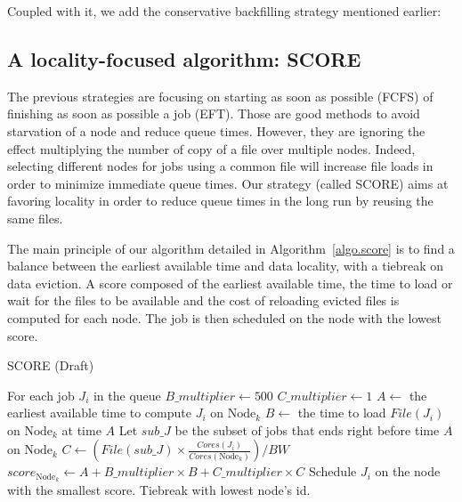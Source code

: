 \documentclass[conference,10pt]{IEEEtran}
\newcommand{\Node}[1]{\ensuremath{\mathrm{Node}_{#1}}\xspace}
\newcommand{\file}{\ensuremath{\mathit{File}}\xspace}
\newcommand{\memory}{\ensuremath{\mathit{Mem}}\xspace}
\newcommand{\bandwidth}{\mathit{BW}\xspace}
\newcommand{\core}{\mathit{Cores}\xspace}
\newcommand{\nodeset}{\ensuremath{\mathbb{N}}\xspace}
\begin{document}
Coupled with it, we add the conservative backfilling strategy mentioned earlier:

\subsection{A locality-focused algorithm: SCORE}

The previous strategies are focusing on starting as soon as possible (FCFS)
of finishing as soon as possible a job (EFT).
Those are good methods to avoid starvation of a node and reduce queue times.
However, they are ignoring the effect multiplying the number of copy of a file
over multiple nodes. Indeed, selecting different nodes for jobs using a common
file will increase file loads in order to minimize immediate queue times.
Our strategy (called SCORE) aims at favoring locality in order to reduce
queue times in the long run by reusing the same files. 

The main principle of our algorithm detailed in Algorithm~\ref{algo.score} 
is to find a balance between the earliest available time and data locality,
with a tiebreak on data eviction. A score composed of the earliest available 
time, the time to load or wait for the files to be available and the cost of 
reloading evicted files is computed for each node. The job is then scheduled
on the node with the lowest score.

\begin{algorithm}[htbp]\caption{SCORE (Draft)}\label{algo.score}\begin{algorithmic}[1]
	\Statex For each job $J_i$ in the queue
	\State $B\_multiplier \gets 500$
	\State $C\_multiplier \gets 1$
	\ForEach {$\Node{k} \in \nodeset$}
		\State $A \gets$ the earliest available time to compute $J_i$ on $\Node{k}$
		\State $B \gets$ the time to load $\file(J_i)$ on $\Node{k}$ at time $A$ 
		\State Let $\mathit{sub\_J}$ be the subset of jobs that ends right before time $A$ on $\Node{k}$
		\State $C \gets (\file(\mathit{sub\_J}) \times \frac{\core(J_i)}{\core(\Node{k})})/\bandwidth$
		\State $score_{\Node{k}} \gets A + B\_multiplier \times B + C\_multiplier \times C$
	\EndFor
	\State Schedule $J_i$ on the node with the smallest score. Tiebreak with lowest node's id.
\end{algorithmic}\end{algorithm}
\end{document}
